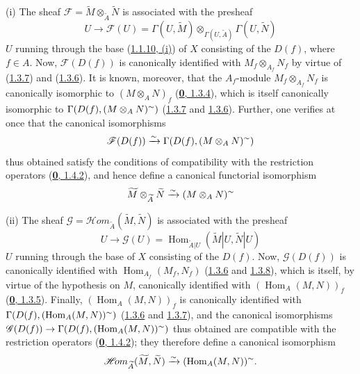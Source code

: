 (i) The sheaf
$\mathscr{F}=\widetilde{M}\otimes_{\widetilde{A}}\widetilde{N}$ is
associated with the presheaf
\[
  U\to\mathscr{F}(U)=\Gamma(U,\widetilde{M})
  \otimes_{\Gamma(U,\widetilde{A})}\Gamma(U,\widetilde{N})
\]
$U$ running through the base (\hyperref[I.1.1.10]{1.1.10, (i)}) of $X$
consisting of the $D(f)$, where $f\in A$. Now, $\mathscr{F}(D(f))$ is
canonically identified with $M_f\otimes_{A_f}N_f$ by virtue of
(\hyperref[I.1.3.7]{1.3.7}) and (\hyperref[I.1.3.6]{1.3.6}). It is
known, moreover, that the $A_f$-module $M_f\otimes_{A_f}N_f$ is canonically
isomorphic to $(M\otimes_A N)_f$ (\hyperref[0.1.3.4]{\textbf{0}, 1.3.4}), which is
itself canonically isomorphic to
$\Gamma(D(f),(M\otimes_A N)^{\sim})$
(\hyperref[I.1.3.7]{1.3.7} and \hyperref[I.1.3.6]{1.3.6}). Further,
one verifies at once that the canonical isomorphisms
\[
  \mathscr{F}(D(f))\xrightarrow{\sim}\Gamma(D(f),(M\otimes_A N)^{\sim})
\]
thus obtained satisfy the conditions of compatibility with the restriction
operators (\hyperref[0.1.4.2]{\textbf{0}, 1.4.2}), and hence define a canonical
functorial isomorphism
\[
  \widetilde{M}\otimes_{\widetilde{A}}\widetilde{N}
  \xrightarrow{\sim}(M\otimes_A N)^{\sim}
\]

(ii) The sheaf
$\mathscr{G}=\mathscr{H}\!om_{\widetilde{A}}(\widetilde{M},\widetilde{N})$
is associated with the presheaf
\[
  U\longrightarrow\mathscr{G}(U)
  =\operatorname{Hom}_{\widetilde{A}|U}
  (\widetilde{M}|U,\widetilde{N}|U)
\]
$U$ running through the base of $X$ consisting of the $D(f)$. Now,
$\mathscr{G}(D(f))$ is canonically identified with
$\operatorname{Hom}_{A_f}(M_f,N_f)$
(\hyperref[I.1.3.6]{1.3.6} and \hyperref[I.1.3.8]{1.3.8}), which
is itself, by virtue of the hypothesis on $M$, canonically identified with
$(\operatorname{Hom}_A(M,N))_f$
(\hyperref[0.1.3.5]{\textbf{0}, 1.3.5}). Finally,
$(\operatorname{Hom}_A(M,N))_f$ is canonically identified with
$\Gamma(D(f),(\operatorname{Hom}_A(M,N))^{\sim})$
(\hyperref[I.1.3.6]{1.3.6} and \hyperref[I.1.3.7]{1.3.7}), and the
canonical isomorphisms
$\mathscr{G}(D(f))\to
\Gamma(D(f),(\operatorname{Hom}_A(M,N))^{\sim})$ thus obtained are
compatible with the restriction operators
(\hyperref[0.1.4.2]{\textbf{0}, 1.4.2}); they therefore define a canonical
isomorphism
\[
  \mathscr{H}\!om_{\widetilde{A}}(\widetilde{M},\widetilde{N})
  \xrightarrow{\sim}(\operatorname{Hom}_A(M,N))^{\sim}.
\]

